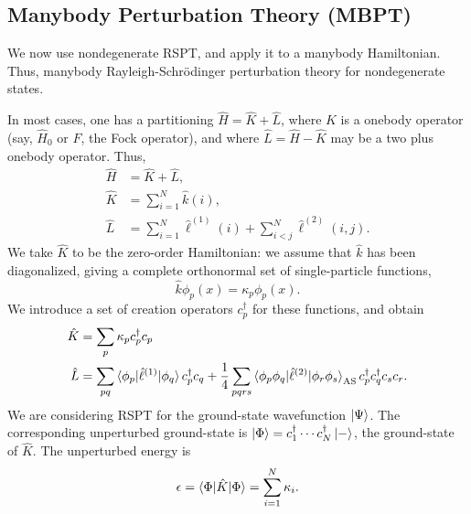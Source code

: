\documentclass{report}
\theoremstyle{plain}
\theoremstyle{definition}
\begin{document}
\subsection{Manybody Perturbation Theory (MBPT)}

We now use nondegenerate RSPT, and apply it to a manybody
Hamiltonian. Thus, manybody Rayleigh-Schr\"odinger perturbation theory
for nondegenerate states. 

In most cases, one has a partitioning $\hat{H} = \hat{K}
+ \hat{L}$, where $\hat{K}$ is a onebody operator (say, $\hat{H}_0$ or
$\hat{F}$, the Fock operator), and where $\hat{L} = \hat{H} - \hat{K}$
may be a two plus onebody operator. Thus,
\begin{align}
  \hat{H} &= \hat{K} + \hat{L}, \\
  \hat{K} &= \sum_{i=1}^N \hat{k}(i), \\
  \hat{L} &= \sum_{i=1}^N \hat{\ell}^{(1)}(i) + \sum_{i<j}^N \hat{\ell}^{(2)}(i,j).
\end{align}
We take $\hat{K}$ to be the zero-order Hamiltonian: we assume that
$\hat{k}$ has been diagonalized, giving a complete orthonormal set of
single-particle functions,
\begin{equation}
  \hat{k} \phi_p(x) = \kappa_p \phi_p(x).
\end{equation}
We introduce a set of creation operators $c^\dag_p$ for these
functions, and obtain
\begin{align}
  \hat{K} &= \sum_p \kappa_p c^\dag_p c_p \\
  \hat{L} &= \sum_{pq} \braket{\phi_p|\hat{\ell}^{(1)}|\phi_q}
  c^\dag_p c_q + \frac{1}{4}\sum_{pqrs}
  \braket{\phi_p\phi_q|\hat{\ell}^{(2)}|\phi_r\phi_s}_\text{AS}
  c^\dag_p c^\dag_q c_s c_r.
\end{align}
We are considering RSPT for the ground-state wavefunction
$\ket{\Psi}$. The corresponding unperturbed ground-state is
$\ket{\Phi} = c^\dag_1\cdots c^\dag_N\ket{-}$, the ground-state of
$\hat{K}$. The unperturbed energy is
\begin{equation}
  \epsilon = \braket{\Phi|\hat{K}|\Phi} = \sum_{i=1}^N \kappa_i.
\end{equation}
\end{document}
